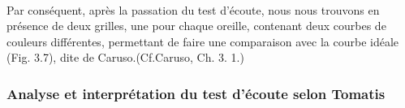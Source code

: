  \\
 Par conséquent, après la passation du test d\textquoteright écoute, nous nous
trouvons en présence de deux grilles, une  pour chaque oreille, contenant deux courbes
de couleurs différentes, permettant de faire une comparaison avec la courbe
 idéale (Fig. 3.7), dite de Caruso.(Cf.Caruso, Ch. 3. 1.)
\subsubsection{Analyse et interprétation du test d'écoute selon Tomatis}

